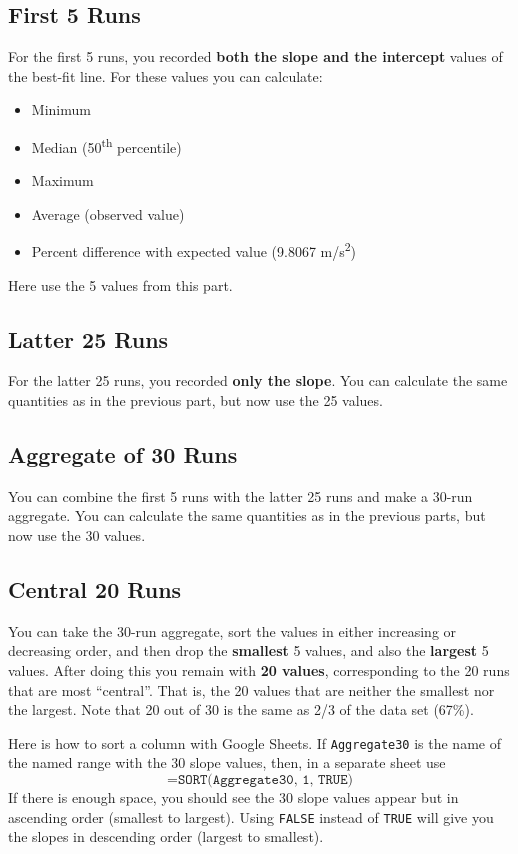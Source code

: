 \subsection{First 5 Runs} \label{sec:01.first.5}
%
For the first 5 runs, you recorded \textbf{both the slope and the intercept} values of the best-fit line. For these values you can calculate:
\begin{itemize}
    \item Minimum
    \item Median (50\textsuperscript{th} percentile)
    \item Maximum
    \item Average (observed value)
    \item Percent difference with expected value (9.8067 m/s\textsuperscript{2})
\end{itemize}
Here use the 5 values from this part.
%
\subsection{Latter 25 Runs} \label{sec:01.latter.25}
%
For the latter 25 runs, you recorded \textbf{only the slope}. You can calculate the same quantities as in the previous part, but now use the 25 values.
%
\subsection{Aggregate of 30 Runs} \label{sec:01.all.30}
%
You can combine the first 5 runs with the latter 25 runs and make a 30-run aggregate. You can calculate the same quantities as in the previous parts, but now use the 30 values.
%
\subsection{Central 20 Runs} \label{sec:01.central.20}
%
You can take the 30-run aggregate, sort the values in either increasing or decreasing order, and then drop the \textbf{smallest} 5 values, and also the \textbf{largest} 5 values. After doing this you remain with \textbf{20 values}, corresponding to the 20 runs that are most ``central''. That is, the 20 values that are neither the smallest nor the largest. Note that 20 out of 30 is the same as 2/3 of the data set (67\%).

Here is how to sort a column with Google Sheets. If \texttt{Aggregate30} is the name of the named range with the 30 slope values, then, in a separate sheet use
\begin{equation}
    \texttt{=SORT(Aggregate30, 1, TRUE)}
\end{equation}
If there is enough space, you should see the 30 slope values appear but in ascending order (smallest to largest). Using \texttt{FALSE} instead of \texttt{TRUE} will give you the slopes in descending order (largest to smallest).
%

